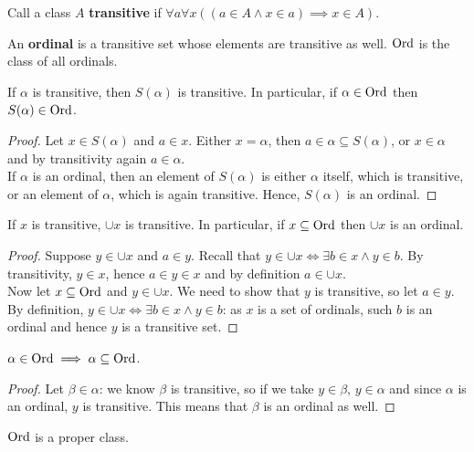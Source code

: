 \documentclass[twoside,openright,titlepage,numbers=noenddot,%
               headinclude,footinclude,cleardoublepage=empty,abstract=on,
               BCOR=23mm,paper=letter,fontsize=11pt
               ]{scrreprt}
\begin{document}
Call a class $A$ \textbf{transitive} if $\forall a \forall x((a \in A \land x \in a) \implies x \in A)$.
\begin{definition}
    An \textbf{ordinal} is a transitive set whose elements are transitive as well. $\mathrm{Ord}$ is the class of all ordinals.
\end{definition}
\begin{proposition}
    If $\alpha$ is transitive, then $S(\alpha)$ is transitive. In particular, if $\alpha \in \mathrm{Ord}$ then $S(\alpha) \in \mathrm{Ord}$.
\end{proposition}
\begin{proof}
    Let $x \in S(\alpha)$ and $a \in x$. Either $x = \alpha$, then $a \in \alpha \subseteq S(\alpha)$, or $x \in \alpha$ and by transitivity again $a \in \alpha$. \\
    If $\alpha$ is an ordinal, then an element of $S(\alpha)$ is either $\alpha$ itself, which is transitive, or an element of $\alpha$, which is again transitive. Hence, $S(\alpha)$ is an ordinal. 
\end{proof}
\begin{proposition}
    If $x$ is transitive, $\cup x$ is transitive. In particular, if $x \subseteq \mathrm{Ord}$ then $\cup x$ is an ordinal.
\end{proposition}
\begin{proof}
    Suppose $y \in \cup x$ and $a \in y$. Recall that $y \in \cup x \iff \exists b \in x \land y \in b$. By transitivity, $y \in x$, hence $a \in y \in x$ and by definition $a \in \cup x$. \\
    Now let $x \subseteq \mathrm{Ord}$ and $y \in \cup x$. We need to show that $y$ is transitive, so let $a \in y$. By definition, $y \in \cup x \iff \exists b \in x \land y \in b$: as $x$ is a set of ordinals, such $b$ is an ordinal and hence $y$ is a transitive set.
\end{proof}
\begin{proposition}
    $\alpha \in \mathrm{Ord} \implies \alpha \subseteq \mathrm{Ord}$.
\end{proposition}
\begin{proof}
    Let $\beta \in \alpha$: we know $\beta$ is transitive, so if we take $y \in \beta$, $y \in \alpha$ and since $\alpha$ is an ordinal, $y$ is transitive. This means that $\beta$ is an ordinal as well.
\end{proof}
\begin{theorem}
    $\mathrm{Ord}$ is a proper class.
\end{theorem}
\end{document}
